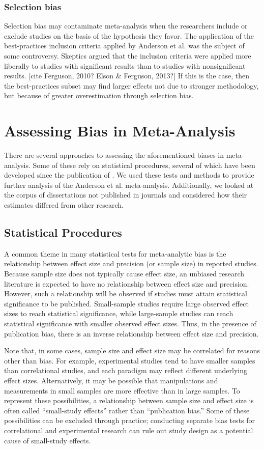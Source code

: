 \documentclass[man]{apa6}
\begin{document}
\subsubsection{Selection bias}
Selection bias may contaminate meta-analysis when the researchers include or exclude studies on the basis of the hypothesis they favor. The application of the best-practices inclusion criteria applied by Anderson et al. was the subject of some controversy. Skeptics argued that the inclusion criteria were applied more liberally to studies with significant results than to studies with nonsignificant results. [cite Ferguson, 2010? Elson \& Ferguson, 2013?] If this is the case, then the best-practices subset may find larger effects not due to stronger methodology, but because of greater overestimation through selection bias. 

\section{Assessing Bias in Meta-Analysis}
There are several approaches to assessing the aforementioned biases in meta-analysis. Some of these rely on statistical procedures, several of which have been developed since the publication of \citet{Anderson:etal:2010}. We used these tests and methods to provide further analysis of the Anderson et al. meta-analysis. Additionally, we looked at the corpus of dissertations not published in journals and considered how their estimates differed from other research.

\subsection{Statistical Procedures}
A common theme in many statistical tests for meta-analytic bias is the relationship between effect size and precision (or sample size) in reported studies. Because sample size does not typically cause effect size, an unbiased research literature is expected to have no relationship between effect size and precision. However, such a relationship will be observed if studies must attain statistical significance to be published. Small-sample studies require large observed effect sizes to reach statistical significance, while large-sample studies can reach statistical significance with smaller observed effect sizes. Thus, in the presence of publication bias, there is an inverse relationship between effect size and precision. 

Note that, in some cases, sample size and effect size may be correlated for reasons other than bias. For example, experimental studies tend to have smaller samples than correlational studies, and each paradigm may reflect different underlying effect sizes. Alternatively, it may be possible that manipulations and measurements in small samples are more effective than in large samples. To represent these possibilities, a relationship between sample size and effect size is often called ``small-study effects'' rather than ``publication bias.'' Some of these possibilities can be excluded through practice; conducting separate bias tests for correlational and experimental research can rule out study design as a potential cause of small-study effects.
\end{document}
